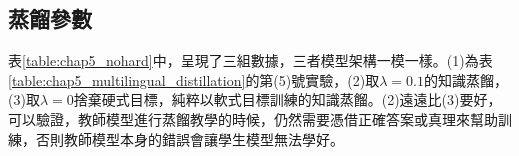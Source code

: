 %

\subsection{蒸餾參數}
表\ref{table:chap5_nohard}中，呈現了三組數據，三者模型架構一模一樣。(1)為表\ref{table:chap5_multilingual_distillation}的第(5)號實驗，(2)取$\lambda = 0.1$的知識蒸餾，(3)取$\lambda = 0$捨棄硬式目標，純粹以軟式目標訓練的知識蒸餾。(2)遠遠比(3)要好，可以驗證，教師模型進行蒸餾教學的時候，仍然需要憑借正確答案或真理來幫助訓練，否則教師模型本身的錯誤會讓學生模型無法學好。

